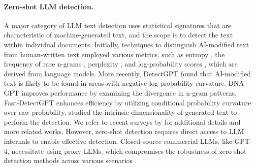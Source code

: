 \documentclass{article}
\begin{document}
\paragraph{Zero-shot LLM detection.} A major category of LLM text detection uses statistical signatures that are characteristic of machine-generated text, and the scope is to detect the text within individual documents. Initially, techniques to distinguish AI-modified text from human-written text employed various metrics, such as entropy \citep{Lavergne2008DetectingFC}, the frequency of rare n-grams \citep{Badaskar2008IdentifyingRO}, perplexity \citep{Beresneva2016ComputerGeneratedTD}, and log-probability scores \citep{solaiman2019release}, which are derived from language models. More recently, DetectGPT \citep{Mitchell2023DetectGPTZM} found that AI-modified text is likely to be found in areas with negative log probability curvature. DNA-GPT \citep{Yang2023DNAGPTDN} improves performance by examining the divergence in n-gram patterns. Fast-DetectGPT \citep{Bao2023FastDetectGPTEZ} enhances efficiency by utilizing conditional probability curvature over raw probability. \citet{Tulchinskii2023IntrinsicDE} studied the intrinsic dimensionality of generated text to perform the detection. We refer to recent surveys by \citet{Yang2023ASO, Ghosal2023TowardsP} for additional details and more related works. However, zero-shot detection requires direct access to LLM internals to enable effective detection. Closed-source commercial LLMs, like GPT-4, necessitate using proxy LLMs, which compromises the robustness of zero-shot detection methods across various scenarios \citep{Sadasivan2023CanAT, Shi2023RedTL, Yang2023ASO, Zhang2023AssayingOT}.
\end{document}
